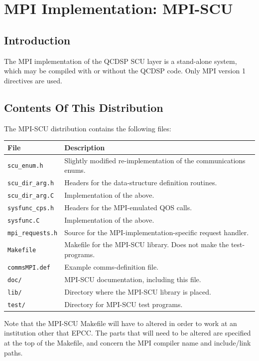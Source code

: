 \documentclass[12pt]{article}
\newcommand{\cde}[1]{{\tt #1}}            %
\begin{document}
\newpage
\section{MPI Implementation: MPI-SCU}
\subsection{Introduction}
The MPI implementation of the QCDSP SCU layer is a stand-alone system,
which may be compiled with or without the QCDSP code.  Only MPI
version 1 directives are used.

\subsection{Contents Of This Distribution}
The MPI-SCU distribution contains the following files:

\begin{tabular}{l|l}
{\bf File} & {\bf Description} \\
\hline
%
\cde{scu\_enum.h} & Slightly modified re-implementation of the
communications enums. \\
\cde{scu\_dir\_arg.h} & Headers for the data-structure definition routines. \\
\cde{scu\_dir\_arg.C} & Implementation of the above. \\
\cde{sysfunc_cps.h} & Headers for the MPI-emulated QOS calls. \\
\cde{sysfunc.C} & Implementation of the above. \\
\cde{mpi\_requests.h} & Source for the MPI-implementation-specific request handler. \\
\cde{Makefile} & Makefile for the MPI-SCU library. Does not make the test-programs. \\
\cde{commsMPI.def} & Example comms-definition file. \\
\cde{doc/} & MPI-SCU documentation, including this file. \\
\cde{lib/} & Directory where the MPI-SCU library is placed. \\
\cde{test/} & Directory for MPI-SCU test programs. \\
%
\end{tabular}

Note that the MPI-SCU Makefile will have to altered in order to work at an
institution other that EPCC.  The parts that will need to be altered
are specified at the top of the Makefile, and concern the MPI compiler
name and include/link paths.
\end{document}
